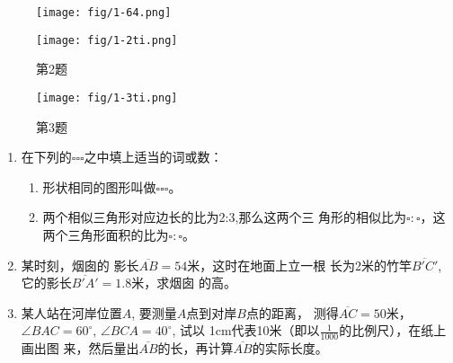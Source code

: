 \begin{figure}[htp]
	\centering
\texttt{[image: fig/1-64.png]}
	\caption{}
\end{figure}


\begin{figure}[htp]\centering
    \begin{minipage}[t]{0.48\textwidth}
    \centering
\texttt{[image: fig/1-2ti.png]}
    \caption*{第2题}
    \end{minipage}
    \begin{minipage}[t]{0.48\textwidth}
    \centering
\texttt{[image: fig/1-3ti.png]}
    \caption*{第3题}
    \end{minipage}
    \end{figure}

\begin{ex}
\begin{enumerate}
	\item 在下列的$\square \square \square $之中填上适当的词或数：
\begin{enumerate}
\item 形状相同的图形叫做$\square \square \square $。
\item 两个相似三角形对应边长的比为2:3,那么这两个三
	角形的相似比为$\square : \square $，这两个三角形面积的比为$\square : \square $。
\end{enumerate}

	\item 某时刻，烟囱的
	影长$\overline{AB}=54$米，这时在地面上立一根
	长为2米的竹竿$\overline{B'C'}$, 它的影长$\overline{B'A'}=1.8$米，求烟囱
	的高。
	\item 某人站在河岸位置$A$, 要测量$A$点到对岸$B$点的距离，
	测得$\overline{AC}=50$米，$\angle BAC=60^{\circ}$, $\angle BCA=40^{\circ}$, 试以
	1cm代表10米（即以$\frac{1}{1000}$的比例尺），在纸上画出图
	来，然后量出$\overline{AB}$的长，再计算$\overline{AB}$的实际长度。
\end{enumerate}
\end{ex}


